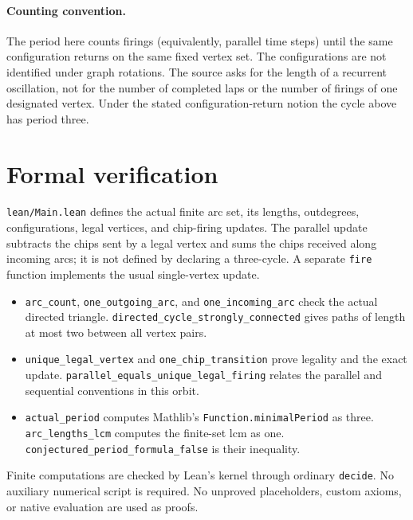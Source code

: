 \documentclass[11pt]{article}
\begin{document}
\paragraph{Counting convention.}
The period here counts firings (equivalently, parallel time steps) until
the same configuration returns on the same fixed vertex set.
The configurations are not identified under graph rotations.
The source asks for the length of a recurrent oscillation, not for the
number of completed laps or the number of firings of one designated
vertex. Under the stated configuration-return notion the cycle above
has period three.

\section{Formal verification}
\texttt{lean/Main.lean} defines the actual finite arc set, its lengths,
outdegrees, configurations, legal vertices, and chip-firing updates.
The parallel update subtracts the chips sent by a legal vertex and sums
the chips received along incoming arcs; it is not defined by declaring
a three-cycle. A separate \texttt{fire} function implements the usual
single-vertex update.
\begingroup\raggedright
\begin{itemize}
\item \texttt{arc\_\allowbreak count}, \texttt{one\_\allowbreak outgoing\_\allowbreak arc}, and
      \texttt{one\_\allowbreak incoming\_\allowbreak arc} check the actual directed triangle.
      \texttt{directed\_\allowbreak cycle\_\allowbreak strongly\_\allowbreak connected} gives paths of
      length at most two between all vertex pairs.
\item \texttt{unique\_\allowbreak legal\_\allowbreak vertex} and
      \texttt{one\_\allowbreak chip\_\allowbreak transition} prove legality and the exact update.
      \texttt{parallel\_\allowbreak equals\_\allowbreak unique\_\allowbreak legal\_\allowbreak firing} relates the
      parallel and sequential conventions in this orbit.
\item \texttt{actual\_\allowbreak period} computes Mathlib's
      \texttt{Function.minimalPeriod} as three.
      \texttt{arc\_\allowbreak lengths\_\allowbreak lcm} computes the finite-set lcm as one.
      \texttt{conjectured\_\allowbreak period\_\allowbreak formula\_\allowbreak false} is their inequality.
\end{itemize}
\endgroup
Finite computations are checked by Lean's kernel through ordinary
\texttt{decide}. No auxiliary numerical script is required. No unproved
placeholders, custom axioms, or native evaluation are used as proofs.
\end{document}
